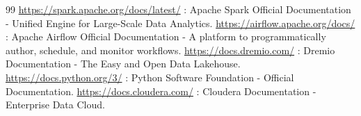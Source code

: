 \begin{thebibliography}{99}
     \url{https://spark.apache.org/docs/latest/} : Apache Spark Official Documentation - Unified Engine for Large-Scale Data Analytics.
     \url{https://airflow.apache.org/docs/} : Apache Airflow Official Documentation - A platform to programmatically author, schedule, and monitor workflows.
     \url{https://docs.dremio.com/} : Dremio Documentation - The Easy and Open Data Lakehouse.
     \url{https://docs.python.org/3/} : Python Software Foundation - Official Documentation.
     \url{https://docs.cloudera.com/} : Cloudera Documentation - Enterprise Data Cloud.
\end{thebibliography}
